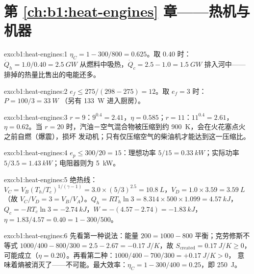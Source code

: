 \section*{第 \ref{ch:b1:heat-engines} 章——热机与机器}

\begin{solution}{exo:b1:heat-engines:1}
$\eta_C = 1 - 300/800 = 0.625$。取 $0.40$ 时：$\dot Q_h = 1.0/0.40 = \qty{2.5}{GW}$
从燃料中吸热，$\dot Q_c = 2.5 - 1.0 = \qty{1.5}{GW}$ 排入河中——
排掉的热量比售出的电能还多。
\end{solution}

\begin{solution}{exo:b1:heat-engines:2}
$e_f \leq 275/(298 - 275) = 12$。取 $e_f = 3$ 时：$P = 100/3 = \qty{33}{W}$
（另有 \qty{133}{W} 进入厨房）。
\end{solution}

\begin{solution}{exo:b1:heat-engines:3}
$r = 9$：$9^{0.4} = 2.41$，$\eta = 0.585$；$r = 11$：$11^{0.4} = 2.61$，
$\eta = 0.62$。当 $r = 20$ 时，汽油－空气混合物被压缩到约
\qty{900}{K}，会在火花塞点火之前自燃（爆震），损坏
发动机；只有仅压缩空气的柴油机才能达到这一压缩比。
\end{solution}

\begin{solution}{exo:b1:heat-engines:4}
$e_p \leq 300/20 = 15$：理想功率 $5/15 = \qty{0.33}{kW}$；实际功率 $5/3.5 =
\qty{1.43}{kW}$；电阻器则为 \qty{5}{kW}。
\end{solution}

\begin{solution}{exo:b1:heat-engines:5}
绝热线：$V_C = V_B(T_h/T_c)^{1/(\gamma-1)} = 3.0 \times (5/3)^{2.5} =
\qty{10.8}{L}$，$V_D = 1.0 \times 3.59 = \qty{3.59}{L}$（故 $V_C/V_D = 3 =
V_B/V_A$）。$Q_h = RT_h\ln3 = 8.314 \times 500 \times 1.099 = \qty{4.57}{kJ}$，
$Q_c = -RT_c\ln3 = \qty{-2.74}{kJ}$，$W = -(4.57 - 2.74) = \qty{-1.83}{kJ}$，
$\eta = 1.83/4.57 = 0.40 = 1 - 300/500$。
\end{solution}

\begin{solution}{exo:b1:heat-engines:6}
先看第一种说法：能量 $200 = 1000 - 800$ 平衡；克劳修斯不等式 $1000/400 - 800/300
= 2.5 - 2.67 = \qty{-0.17}{J/K}$，故 $S_{\mathrm{created}} = \qty{0.17}{J/K} \geq 0$，
可能成立（$\eta = 0.20$）。再看第二种：$1000/400 - 700/300 = +\qty{0.17}{J/K} > 0$，
意味着熵被消灭了——不可能。最大效率：$\eta_C = 1 -
300/400 = 0.25$，即 \qty{250}{J}。
\end{solution}

